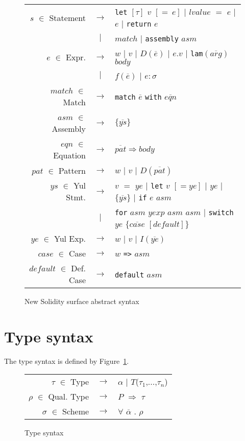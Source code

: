 \documentclass[a4paper, 11pt]{article}
\begin{document}
\begin{figure}[H]
\begin{tabular}{rcl}
    $s$ $\in$ Statement & $\to$ & \texttt{let} $[\tau]$ $v$ $[=\:e]$ $|$ $lvalue$ $=$ $e$ $|$ $e$ $|$ \texttt{return} $e$\\ 
                     & $|$ &  $match$ $|$ \texttt{assembly} $asm$\\
    $e$ $\in$ Expr. & $\to$ & $w$ $|$ $v$ $|$ $D(\overline{e})$ $|$ $e.v$ $|$ \texttt{lam}$(\overline{arg})$ $body$ \\ 
                    & $|$ & $f(\overline{e})$ $|$ $e : \sigma$\\
    $match$ $\in$ Match & $\to$ & \texttt{match} $\overline{e}$ \texttt{with} $\overline{eqn}$\\
    $asm$ $\in$ Assembly & $\to$ & $\{\overline{ys}\}$\\ 
    $eqn$ $\in$ Equation & $\to$ & $\overline{pat}\Rightarrow body$\\ 
    $pat$ $\in$ Pattern & $\to$ & $w$ $|$ $v$ $|$ $D(\overline{pat})$ \\
    $ys$ $\in$ Yul Stmt. & $\to$ & $v$ $=$ $ye$ $|$ \texttt{let} $v$ $[=ye]$ $|$ $ye$ $|$ $\{\overline{ys}\}$ $|$ \texttt{if} $e$ $asm$\\
                            & $|$ & \texttt{for} $asm$ $yexp$ $asm$ $asm$ $|$ \texttt{switch} $ye$ $\{\overline{case}$ $[default]\}$\\
    $ye$ $\in$ Yul Exp. & $\to$ & $w$ $|$ $v$ $|$ $I(\overline{ye})$\\
    $case$ $\in$ Case & $\to$ & $w$ \texttt{=>} $asm$ \\
    $default$ $\in$ Def. Case & $\to$ & \texttt{default} $asm$\\ 
 \end{tabular}
  \centering
  \caption{New Solidity surface abstract syntax}
\end{figure}

\section{Type syntax}

The type syntax is defined by Figure~\ref{fig:typesyntax}. 

\begin{figure}[H] 
  \begin{tabular}{rcl}
    $\tau$ $\in$ Type & $\to$ & $\alpha$ $|$ $T$($\tau_1$,...,$\tau_n$)\\
    $\rho$ $\in$ Qual. Type & $\to$ & $P$ $\Rightarrow$ $\tau$\\ 
    $\sigma$ $\in$ Scheme & $\to$ & $\forall$ $\overline{\alpha}$ $.$ $\rho$\\
  \end{tabular}
  \centering 
  \caption{Type syntax}
  \label{fig:typesyntax}
\end{figure}
\end{document}
